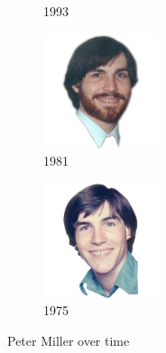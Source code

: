 \begin{figure}
\begin{subfigure}{0.19\textwidth}
\caption{1993}
\end{subfigure}
\begin{subfigure}{0.19\textwidth}
\includegraphics[width=\textwidth]{images/peter_miller_1981.png}
\caption{1981}
\end{subfigure}
\begin{subfigure}{0.19\textwidth}
\includegraphics[width=\textwidth]{images/peter_miller_1975.png}
\caption{1975}
\end{subfigure}
\caption{Peter Miller over time}
\label{fig:peter_miller}
\end{figure}

